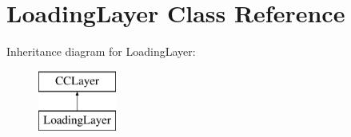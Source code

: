 \hypertarget{interface_loading_layer}{\section{Loading\-Layer Class Reference}
\label{interface_loading_layer}
}
Inheritance diagram for Loading\-Layer\-:\begin{figure}[H]
\begin{center}
\leavevmode
\includegraphics[height=2.000000cm]{interface_loading_layer}
\end{center}
\end{figure}
